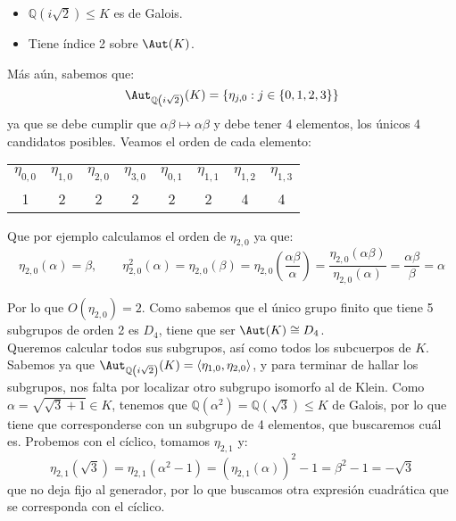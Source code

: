 \begin{ejemplo}
    \begin{itemize}
        \item $\mathbb{Q}\left(i\sqrt{2}\right)\leq K$ es de Galois.
        \item Tiene índice 2 sobre $\Aut(K)$.
    \end{itemize}
    Más aún, sabemos que:
    \begin{equation*}
        \Aut_{\mathbb{Q}\left(i\sqrt{2}\right)}(K) = \{\eta_{j,0} : j \in \{0,1,2,3\}\}
    \end{equation*}
    ya que se debe cumplir que $\alpha\beta\longmapsto \alpha\beta$ y debe tener 4 elementos, los únicos 4 candidatos posibles. Veamos el orden de cada elemento:
    \begin{table}[H]
    \centering
    \begin{tabular}{cccccccc}
        $\eta_{0,0}$ &  $\eta_{1,0}$ & $\eta_{2,0}$ & $\eta_{3,0}$ & $\eta_{0,1}$ & $\eta_{1,1}$ & $\eta_{1,2}$ & $\eta_{1,3}$ \\
        1 & 2 & 2 & 2 & 2 & 2 & 4 & 4
    \end{tabular}
    \end{table}
    \noindent
    Que por ejemplo calculamos el orden de $\eta_{2,0}$ ya que:
    \begin{equation*}
        \eta_{2,0}(\alpha) = \beta, \qquad \eta_{2,0}^2(\alpha) = \eta_{2,0}(\beta) = \eta_{2,0}\left(\frac{\alpha\beta}{\alpha}\right) = \frac{\eta_{2,0}(\alpha\beta)}{\eta_{2,0}(\alpha)} = \frac{\alpha\beta}{\beta} = \alpha
    \end{equation*}

    Por lo que $O(\eta_{2,0}) = 2$. Como sabemos que el único grupo finito que tiene 5 subgrupos de orden 2 es $D_4$, tiene que ser $\Aut(K) \cong D_4$.\\

    \noindent
    Queremos calcular todos sus subgrupos, así como todos los subcuerpos de $K$.\\

    \noindent
    Sabemos ya que $\Aut_{\mathbb{Q}\left(i\sqrt{2}\right)}(K) = \langle \eta_{1,0}, \eta_{2,0} \rangle $, y para terminar de hallar los subgrupos, nos falta por localizar otro subgrupo isomorfo al de Klein. Como $\alpha = \sqrt{\sqrt{3}+1}\in K$, tenemos que $\mathbb{Q}(\alpha^2)=\mathbb{Q}(\sqrt{3})\leq K$ de Galois, por lo que tiene que corresponderse con un subgrupo de 4 elementos, que buscaremos cuál es. Probemos con el cíclico, tomamos $\eta_{2,1}$ y:
    \begin{equation*}
        \eta_{2,1}\left(\sqrt{3}\right) = \eta_{2,1}(\alpha^2 -1) = {(\eta_{2,1}(\alpha))}^{2} - 1 = \beta^2 -1 = -\sqrt{3}
    \end{equation*}
    que no deja fijo al generador, por lo que buscamos otra expresión cuadrática que se corresponda con el cíclico.\\


\end{ejemplo}
